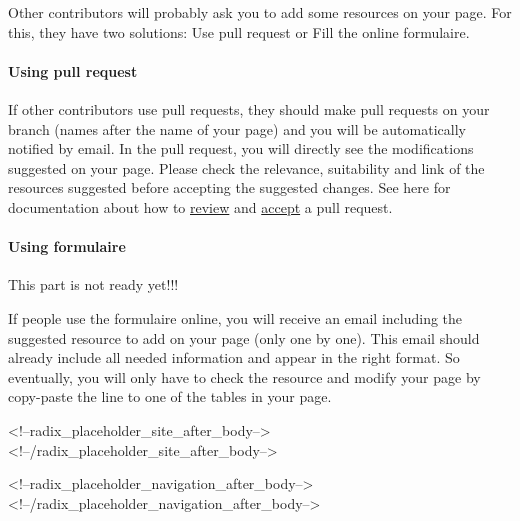 \documentclass[
]{article}
\begin{document}
Other contributors will probably ask you to add some resources on your
page. For this, they have two solutions: Use pull request or Fill the
online formulaire.

\hypertarget{using-pull-request}{%
\paragraph{Using pull request}\label{using-pull-request}}

If other contributors use pull requests, they should make pull requests
on your branch (names after the name of your page) and you will be
automatically notified by email. In the pull request, you will directly
see the modifications suggested on your page. Please check the
relevance, suitability and link of the resources suggested before
accepting the suggested changes. See here for documentation about how to
\href{https://docs.github.com/en/pull-requests/collaborating-with-pull-requests/reviewing-changes-in-pull-requests/about-pull-request-reviews}{review}
and
\href{https://docs.github.com/en/pull-requests/collaborating-with-pull-requests/incorporating-changes-from-a-pull-request/about-pull-request-merges}{accept}
a pull request.

\hypertarget{using-formulaire}{%
\paragraph{Using formulaire}\label{using-formulaire}}

This part is not ready yet!!!

If people use the formulaire online, you will receive an email including
the suggested resource to add on your page (only one by one). This email
should already include all needed information and appear in the right
format. So eventually, you will only have to check the resource and
modify your page by copy-paste the line to one of the tables in your
page.

<!--radix_placeholder_site_after_body-->
<!--/radix_placeholder_site_after_body-->

<!--radix_placeholder_navigation_after_body-->
<!--/radix_placeholder_navigation_after_body-->
\end{document}
